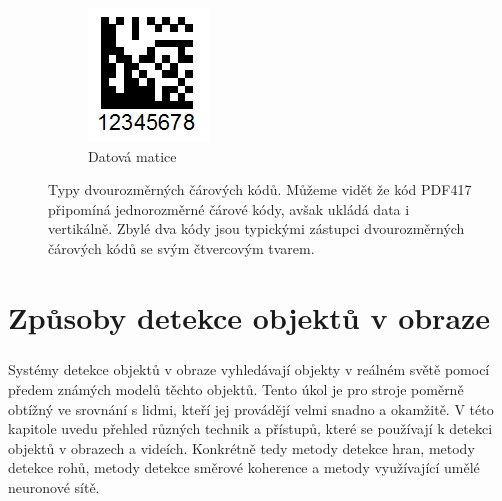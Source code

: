 \begin{figure}[h]
\begin{subfigure}{0.3\textwidth}
    \includegraphics[width=0.9\linewidth]{obrazky-figures/datamatrix.png}\hfill
    \caption{Datová matice}
    \end{subfigure}
    \caption{Typy dvourozměrných čárových kódů. Můžeme vidět že kód PDF417 připomíná jednorozměrné čárové kódy, avšak ukládá data i vertikálně. Zbylé dva kódy jsou typickými zástupci dvourozměrných čárových kódů se svým čtvercovým tvarem\protect\footnotemark{}.}
    \label{2d_barcodes}
\end{figure}
\chapter{Způsoby detekce objektů v obraze}
\label{detekce_v_obraze}
\paragraph{}Systémy detekce objektů v obraze vyhledávají objekty v reálném světě pomocí předem známých modelů těchto objektů. Tento úkol je pro stroje poměrně obtížný ve srovnání s lidmi, kteří jej provádějí velmi snadno a okamžitě. V této kapitole uvedu přehled různých technik a přístupů, které se používají k detekci objektů v obrazech a videích. Konkrétně tedy metody detekce hran, metody detekce rohů, metody detekce směrové koherence a metody využívající umělé neuronové sítě.


